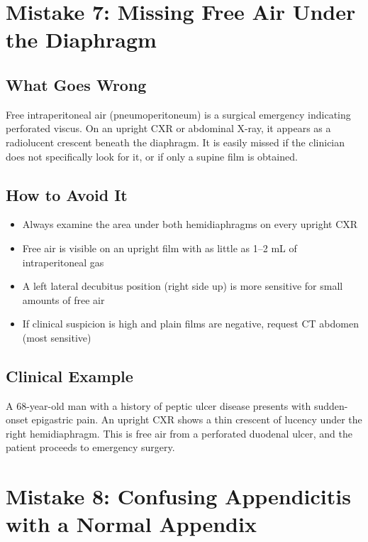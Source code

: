 \clearpage

\section{Mistake 7: Missing Free Air Under the Diaphragm}

\subsection{What Goes Wrong}
Free intraperitoneal air (pneumoperitoneum) is a surgical emergency indicating perforated viscus. On an upright CXR or abdominal X-ray, it appears as a radiolucent crescent beneath the diaphragm. It is easily missed if the clinician does not specifically look for it, or if only a supine film is obtained.

\subsection{How to Avoid It}
\begin{itemize}
    \item Always examine the area under both hemidiaphragms on every upright CXR
    \item Free air is visible on an upright film with as little as 1--2 mL of intraperitoneal gas
    \item A left lateral decubitus position (right side up) is more sensitive for small amounts of free air
    \item If clinical suspicion is high and plain films are negative, request CT abdomen (most sensitive)
\end{itemize}

\subsection{Clinical Example}
A 68-year-old man with a history of peptic ulcer disease presents with sudden-onset epigastric pain. An upright CXR shows a thin crescent of lucency under the right hemidiaphragm. This is free air from a perforated duodenal ulcer, and the patient proceeds to emergency surgery.

\clearpage

\section{Mistake 8: Confusing Appendicitis with a Normal Appendix}

